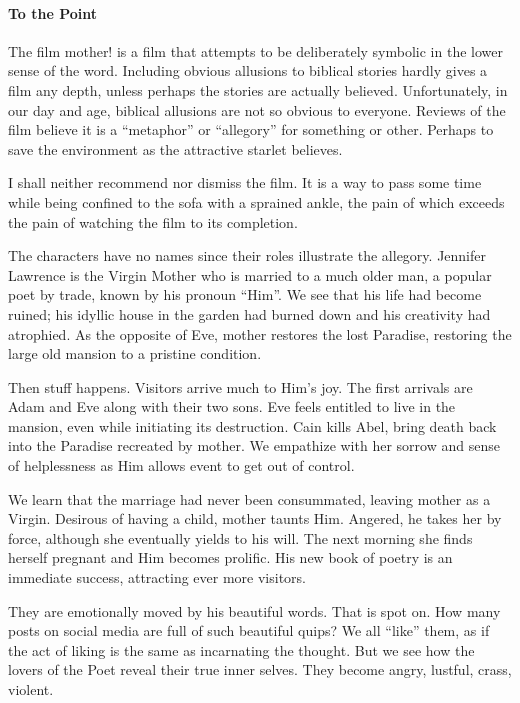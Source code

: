 \paragraph{To the Point}


The film mother! is a film that attempts to be deliberately symbolic in the lower sense of the word. Including obvious allusions to biblical stories hardly gives a film any depth, unless perhaps the stories are actually believed. Unfortunately, in our day and age, biblical allusions are not so obvious to everyone. Reviews of the film believe it is a ``metaphor'' or ``allegory'' for something or other. Perhaps to save the environment as the attractive starlet believes.

I shall neither recommend nor dismiss the film. It is a way to pass some time while being confined to the sofa with a sprained ankle, the pain of which exceeds the pain of watching the film to its completion.

The characters have no names since their roles illustrate the allegory. Jennifer Lawrence is the Virgin Mother who is married to a much older man, a popular poet by trade, known by his pronoun ``Him''. We see that his life had become ruined; his idyllic house in the garden had burned down and his creativity had atrophied. As the opposite of Eve, mother restores the lost Paradise, restoring the large old mansion to a pristine condition.

Then stuff happens. Visitors arrive much to Him's joy. The first arrivals are Adam and Eve along with their two sons. Eve feels entitled to live in the mansion, even while initiating its destruction. Cain kills Abel, bring death back into the Paradise recreated by mother. We empathize with her sorrow and sense of helplessness as Him allows event to get out of control.

We learn that the marriage had never been consummated, leaving mother as a Virgin. Desirous of having a child, mother taunts Him. Angered, he takes her by force, although she eventually yields to his will. The next morning she finds herself pregnant and Him becomes prolific. His new book of poetry is an immediate success, attracting ever more visitors.

They are emotionally moved by his beautiful words. That is spot on. How many posts on social media are full of such beautiful quips? We all ``like'' them, as if the act of liking is the same as incarnating the thought. But we see how the lovers of the Poet reveal their true inner selves. They become angry, lustful, crass, violent.

